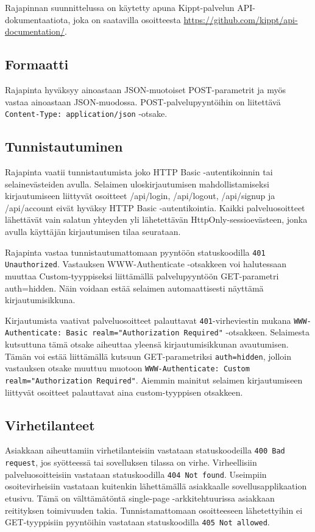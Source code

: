 \documentclass[a4paper,parskip=half]{scrartcl}
\begin{document}
Rajapinnan suunnittelussa on käytetty apuna Kippt-palvelun API-dokumentaatiota,
joka on saatavilla osoitteesta
\url{https://github.com/kippt/api-documentation/}.

\subsection{Formaatti}

Rajapinta hyväksyy ainoastaan JSON-muotoiset POST-parametrit ja myös vastaa
ainoastaan JSON-muodossa. POST-palvelupyyntöihin on liitettävä
\texttt{Content-Type: application/json} -otsake.

\subsection{Tunnistautuminen}

Rajapinta vaatii tunnistautumista joko HTTP Basic -autentikoinnin tai
selainevästeiden avulla.  Selaimen uloskirjautumisen mahdollistamiseksi
kirjautumiseen liittyvät osoitteet /api/login, /api/logout, /api/signup ja
/api/account eivät hyväksy HTTP Basic -autentikointia. Kaikki palveluosoitteet
lähettävät vain salatun yhteyden yli lähetettävän HttpOnly-sessioevästeen,
jonka avulla käyttäjän kirjautumisen tilaa seurataan.

Rajapinta vastaa tunnistautumattomaan pyyntöön statuskoodilla \texttt{401
Unauthorized}.  Vastauksen WWW-Authenticate -otsakkeen voi halutessaan muuttaa
Custom-tyyppiseksi liittämällä palvelupyyntöön GET-parametri auth=hidden.  Näin
voidaan estää selaimen automaattisesti näyttämä kirjautumisikkuna.

Kirjautumista vaativat palveluosoitteet palauttavat \texttt{401}-virheviestin
mukana \texttt{WWW-Authenticate: Basic realm="Authorization Required"}
-otsakkeen. Selaimesta kutsuttuna tämä otsake aiheuttaa yleensä
kirjautumisikkunan avautumisen. Tämän voi estää liittämällä kutsuun
GET-parametriksi \texttt{auth=hidden}, jolloin vastauksen otsake muuttuu
muotoon \texttt{WWW-Authenticate: Custom realm="Authorization Required"}.
Aiemmin mainitut selaimen kirjautumiseen liittyvät osoitteet palauttavat aina
custom-tyyppisen otsakkeen.

\subsection{Virhetilanteet}

Asiakkaan aiheuttamiin virhetilanteisiin vastataan statuskoodeilla \texttt{400
Bad request}, jos syötteessä tai sovelluksen tilassa on virhe. Virheellisiin
palveluosoitteisiin vastataan statuskoodilla \texttt{404 Not found}. Useimpiin
osoitevirheisiin vastataan kuitenkin lähettämällä asiakkaalle
sovellusapplikaation etusivu. Tämä on välttämätöntä single-page
-arkkitehtuurissa asiakkaan reitityksen toimivuuden takia. Tunnistamattomaan
osoitteeseen lähetettyihin ei GET-tyyppisiin pyyntöihin vastataan
statuskoodilla \texttt{405 Not allowed}.
\end{document}
